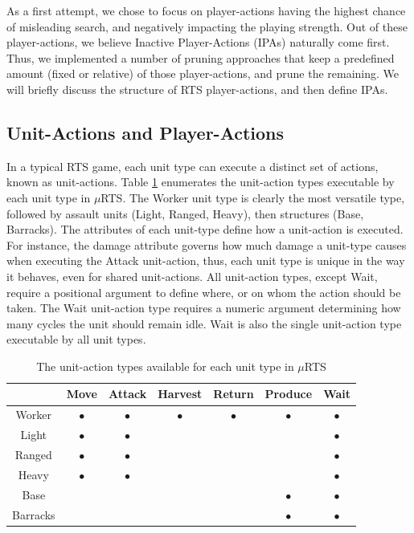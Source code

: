 \documentclass[conference]{IEEEtran}
\newcommand{\mRTS}{$\mu$RTS}
\begin{document}
As a first attempt, we chose to focus on player-actions having the highest chance of misleading search, and negatively impacting the playing strength. Out of these player-actions, we believe Inactive Player-Actions (IPAs) naturally come first. Thus, we implemented a number of pruning approaches that keep a predefined amount (fixed or relative) of those player-actions, and prune the remaining. We will briefly discuss the structure of RTS player-actions, and then define IPAs.

\subsection{Unit-Actions and Player-Actions}

In a typical RTS game, each unit type can execute a distinct set of actions, known as unit-actions. Table \ref{unitActionsTable} enumerates the unit-action types executable by each unit type in \mRTS{}. The Worker unit type is clearly the most versatile type, followed by assault units (Light, Ranged, Heavy), then structures (Base, Barracks). The attributes of each unit-type define how a unit-action is executed. For instance, the damage attribute governs how much damage a unit-type causes when executing the Attack unit-action, thus, each unit type is unique in the way it behaves, even for shared unit-actions. All unit-action types, except Wait, require a positional argument to define where, or on whom the action should be taken. The Wait unit-action type requires a numeric argument determining how many cycles the unit should remain idle. Wait is also the single unit-action type executable by all unit types.

\begin{table}[!h]
\renewcommand{\arraystretch}{1.3}
\caption{The unit-action types available for each unit type in \mRTS{}}
\label{unitActionsTable}
\centering
\begin{tabular}{|c|c|c|c|c|c|c|}
\cline{2-7}
\multicolumn{1}{c|}{} & Move & Attack & Harvest & Return & Produce & Wait \\
\hline
Worker   & $\bullet$ & $\bullet$ & $\bullet$ & $\bullet$ & $\bullet$ & $\bullet$ \\
Light    & $\bullet$ & $\bullet$ & & & & $\bullet$ \\
Ranged   & $\bullet$ & $\bullet$ & & & & $\bullet$ \\
Heavy    & $\bullet$ & $\bullet$ & & & & $\bullet$ \\
Base     & & & & & $\bullet$ & $\bullet$ \\
Barracks & & & & & $\bullet$ & $\bullet$ \\
\hline
\end{tabular}
\end{table}
\end{document}
